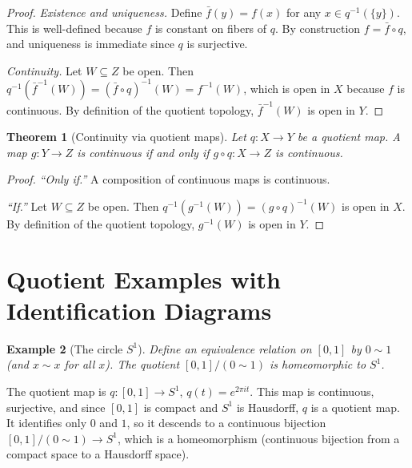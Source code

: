 \documentclass[11pt,a4paper,twoside]{book}
\newtheorem{theorem}{Theorem}[section]
\theoremstyle{remark}
\theoremstyle{definition}
\newtheorem{exampleplain}[theorem]{Example}
\theoremstyle{definition}
\newenvironment{example}[1][]{%
  \begin{exampleplain}[#1]\itshape
}{%
  \end{exampleplain}
}
\begin{document}
\begin{proof}
\emph{Existence and uniqueness.}\;
Define $\bar{f}(y)=f(x)$ for any $x\in q^{-1}(\{y\})$.  This is
well-defined because $f$ is constant on fibers of $q$.  By
construction $f=\bar{f}\circ q$, and uniqueness is immediate since
$q$ is surjective.

\emph{Continuity.}\;
Let $W\subseteq Z$ be open.  Then
$q^{-1}(\bar{f}^{-1}(W))=(\bar{f}\circ q)^{-1}(W)=f^{-1}(W)$,
which is open in $X$ because $f$ is continuous.  By definition
of the quotient topology, $\bar{f}^{-1}(W)$ is open in $Y$.
\end{proof}

\begin{theorem}[Continuity via quotient maps]
\label{thm:continuity-via-quotient}
Let $q\colon X\to Y$ be a quotient map.  A map $g\colon Y\to Z$
is continuous if and only if $g\circ q\colon X\to Z$ is continuous.
\end{theorem}

\begin{proof}
\emph{``Only if.''}\; A composition of continuous maps is continuous.

\emph{``If.''}\; Let $W\subseteq Z$ be open.  Then
$q^{-1}(g^{-1}(W))=(g\circ q)^{-1}(W)$ is open in $X$.  By definition
of the quotient topology, $g^{-1}(W)$ is open in $Y$.
\end{proof}

\section{Quotient Examples with Identification Diagrams}
\label{sec:quotient-examples}

\begin{example}[The circle $S^1$]\label{ex:circle-quotient}
Define an equivalence relation on $[0,1]$ by $0\sim 1$ (and $x\sim x$
for all $x$).  The quotient $[0,1]/(0\sim 1)$ is homeomorphic
to $S^1$.

The quotient map is $q\colon[0,1]\to S^1$, $q(t)=e^{2\pi it}$.
This map is continuous, surjective, and since $[0,1]$ is compact
and $S^1$ is Hausdorff, $q$ is a quotient map.  It identifies only
$0$ and $1$, so it descends to a continuous bijection
$[0,1]/(0\sim 1)\to S^1$, which is a homeomorphism (continuous
bijection from a compact space to a Hausdorff space).
\end{example}
\end{document}
